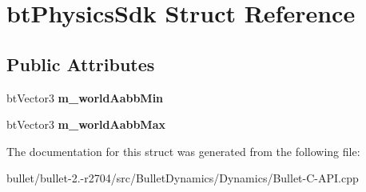 \hypertarget{structbt_physics_sdk}{\section{bt\+Physics\+Sdk Struct Reference}
\label{structbt_physics_sdk}
}
\subsection*{Public Attributes}
\begin{DoxyCompactItemize}
\item 
\hypertarget{structbt_physics_sdk_a734b85b46612cc8a0889e69d7389a21b}{bt\+Vector3 {\bfseries m\+\_\+world\+Aabb\+Min}}\label{structbt_physics_sdk_a734b85b46612cc8a0889e69d7389a21b}

\item 
\hypertarget{structbt_physics_sdk_adb2daf1fbfb76a2e0cd8fc338a62b128}{bt\+Vector3 {\bfseries m\+\_\+world\+Aabb\+Max}}\label{structbt_physics_sdk_adb2daf1fbfb76a2e0cd8fc338a62b128}

\end{DoxyCompactItemize}


The documentation for this struct was generated from the following file\+:\begin{DoxyCompactItemize}
\item 
bullet/bullet-\/2.-\/r2704/src/\+Bullet\+Dynamics/\+Dynamics/Bullet-\/\+C-\/\+A\+P\+I.\+cpp\end{DoxyCompactItemize}
